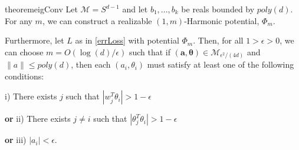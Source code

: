 \documentclass{article}
\begin{document}
\begin{restatable}{theorem}{eigConv}
\label{eigConv}
Let $\mathcal{M} = S^{d-1}$ and let $b_1,...,b_k$ be reals bounded by $poly(d)$. For any $m$, we can construct a realizable $(1,m)$-Harmonic potential, $\Phi_m$. 

Furthermore, let $L$ as in \eqref{errLoss} with potential $\Phi_m$. Then, for all $ 1 > \epsilon > 0$, we can choose $m = O(\log(d)/\epsilon)$ such that if $(\boldsymbol{a,\theta}) \in \mathcal{M}_{\epsilon^2/(4d)}$ and $\|a\| \leq poly(d)$, then each $(a_i, \theta_i)$ must satisfy at least one of the following conditions:


i) There exists $j$ such that $|w_j^T\theta_i| > 1- \epsilon$ 

{\bf or} ii) There exists $j\neq i$ such that $|\theta_j^T\theta_i| > 1- \epsilon$ 

{\bf or} iii) $|a_i| < \epsilon.$
\end{restatable}
%
\end{document}
